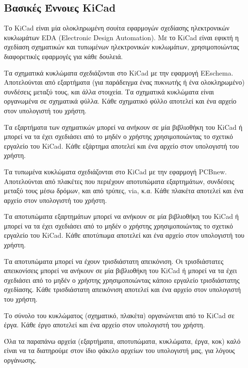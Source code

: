 \documentclass[a4paper]{article}
\begin{document}
\subsection{Βασικές Έννοιες KiCad}
Το \textenglish{KiCad} είναι μία ολοκληρωμένη σουίτα εφαρμογών σχεδίασης ηλεκτρονικών κυκλωμάτων \textenglish{EDA (Electronic Design Automation)}. Με το \textenglish{KiCad} είναι εφικτή η σχεδίαση σχηματικών και τυπωμένων ηλεκτρονικών κυκλωμάτων, χρησιμοποιώντας διαφορετικές εφαρμογές για κάθε δουλειά.

Τα σχηματικά κυκλώματα σχεδιάζονται στο \textenglish{KiCad} με την εφαρμογή \textenglish{EEschema}. Αποτελούνται από εξαρτήματα (για παράδειγμα ένας πυκνωτής ή ένα ολοκληρωμένο) συνδέσεις μεταξύ τους, και άλλα στοιχεία. Τα σχηματικά κυκλώματα είναι οργανωμένα σε σχηματικά φύλλα. Κάθε σχηματικό φύλλο αποτελεί και ένα αρχείο στον υπολογιστή του χρήστη.

Τα εξαρτήματα των σχηματικών μπορεί να ανήκουν σε μία βιβλιοθήκη του \textenglish{KiCad} ή μπορεί να τα έχει σχεδιάσει από το μηδέν ο χρήστης χρησιμοποιώντας το σχετικό εργαλείο του \textenglish{KiCad}. Κάθε εξάρτημα αποτελεί και ένα αρχείο στον υπολογιστή του χρήστη.

Τα τυπωμένα κυκλώματα σχεδιάζονται στο \textenglish{KiCad} με την εφαρμογή PCBnew. Αποτελούνται από πλακέτες που περιέχουν αποτυπώματα εξαρτημάτων, συνδέσεις μεταξύ τους μέσω δρόμων, και από τρύπες, via, κ.α.
Κάθε πλακέτα αποτελεί και ένα αρχείο στον υπολογιστή του χρήστη. 

Τα αποτυπώματα εξαρτημάτων μπορεί να ανήκουν σε μία βιβλιοθήκη του \textenglish{KiCad} ή μπορεί να τα έχει σχεδιάσει από το μηδέν ο χρήστης χρησιμοποιώντας το σχετικό εργαλείο του \textenglish{KiCad}. Κάθε αποτύπωμα αποτελεί και ένα αρχείο στον υπολογιστή του χρήστη. 

Τα αποτυπώματα μπορεί να έχουν τρισδιάστατη απεικόνιση. Οι τρισδιάστατες απεικονίσεις μπορεί να ανήκουν σε μία βιβλιοθήκη του \textenglish{KiCad} ή μπορεί να τα έχει σχεδιάσει από το μηδέν ο χρήστης χρησιμοποιώντας κάποιο εργαλείο τρισδιάστατης σχεδίασης. Κάθε τρισδιάστατη απεικόνιση αποτελεί και ένα αρχείο στον υπολογιστή του χρήστη. 

Το σύνολο του κυκλώματος (σχηματικό, πλακέτα) οργανώνεται από το \textenglish{KiCad} σε έργα. Κάθε έργο αποτελεί και ένα αρχείο στον υπολογιστή του χρήστη. 

Όλα τα παραπάνω αρχεία (εξαρτήματα, αποτυπώματα, κυκλώματα, έργα, κοκ) καλό είναι να τα διατηρούμε στον ίδιο φάκελο αρχείων του υπολογιστή μας, για λόγους οργάνωσης.
\end{document}
